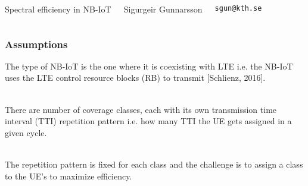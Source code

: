 \documentclass[aspectratio=43,t]{beamer}
\begin{document}
\begin{frame}
  \vspace{0.30\textheight}
  
\begin{columns}[]
\column{30em}
\Large{\centerline{Spectral efficiency in NB-IoT}}

\vspace{0.1\textheight}

\small{\centerline{Sigurgeir Gunnarsson}}
\scriptsize{\centerline{\tt sgun@kth.se}}
\scriptsize{\centerline{}}
\end{columns}
\end{frame}





\begin{frame}
\frametitle{Assumptions}

The type of NB-IoT is the one where it is coexisting with LTE i.e. the NB-IoT uses the LTE control resource blocks (RB) to transmit [Schlienz, 2016].

~\\

There are number of coverage classes, each with its own transmission time interval (TTI) repetition pattern i.e. how many TTI the UE gets assigned in a given cycle.

~\\

The repetition pattern is fixed for each class and the challenge is to assign a class to the UE's to maximize efficiency.


\end{frame}
\end{document}

